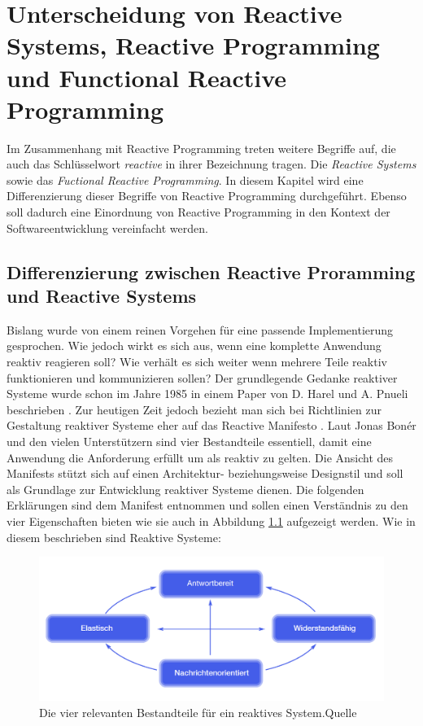 \chapter{Unterscheidung von Reactive Systems, Reactive Programming und Functional Reactive Programming}\label{abgrenzung}
Im Zusammenhang mit Reactive Programming treten weitere Begriffe auf, die auch das Schlüsselwort \textit{reactive} in ihrer Bezeichnung tragen. Die \textit{Reactive Systems} sowie das \textit{Fuctional Reactive Programming}. In diesem Kapitel wird eine Differenzierung dieser Begriffe von Reactive Programming durchgeführt. Ebenso soll dadurch eine Einordnung von Reactive Programming in den Kontext der Softwareentwicklung vereinfacht werden.
\section{Differenzierung zwischen Reactive Proramming und Reactive Systems}
Bislang wurde von einem reinen Vorgehen für eine passende Implementierung gesprochen. Wie jedoch wirkt es sich aus, wenn eine komplette Anwendung reaktiv reagieren soll? Wie verhält es sich weiter wenn mehrere Teile reaktiv funktionieren und kommunizieren sollen? Der grundlegende Gedanke reaktiver Systeme wurde schon im Jahre 1985 in einem Paper von D. Harel und A. Pnueli beschrieben \cite{Harel.1985}. Zur heutigen Zeit jedoch bezieht man sich bei Richtlinien zur Gestaltung reaktiver Systeme eher auf das Reactive Manifesto \cite{Boner.2014}. Laut Jonas Bonér und den vielen Unterstützern sind vier Bestandteile essentiell, damit eine Anwendung die Anforderung erfüllt um als reaktiv zu gelten. Die Ansicht des Manifests stützt sich auf einen Architektur- beziehungsweise Designstil und soll als Grundlage zur Entwicklung reaktiver Systeme dienen. Die folgenden Erklärungen sind dem Manifest entnommen und sollen einen Verständnis zu den vier Eigenschaften bieten wie sie auch in Abbildung \ref{pic:manifest4} aufgezeigt werden. Wie in diesem beschrieben sind Reaktive Systeme:
\begin{figure}[hbt]
	\centering
	\includegraphics[width=1\textwidth]{Abb/manifest4achsen.PNG}
	\caption{Die vier relevanten Bestandteile für ein reaktives System.Quelle \cite{Boner.2014}}
	\label{pic:manifest4}
\end{figure}
